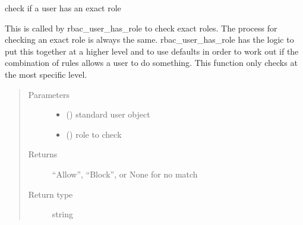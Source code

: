 \documentclass[letterpaper,10pt,english]{sphinxmanual}
\begin{document}
\begin{fulllineitems}
\label{\detokenize{rbac:rbac.core.rbac_user_has_role_exact}}
check if a user has an exact role

This is called by rbac\_user\_has\_role to check exact roles. The process
for checking an exact role is always the same. rbac\_user\_has\_role has
the logic to put this together at a higher level and to use defaults
in order to work out if the combination of rules allows a user to do
something. This function only checks at the most specific level.
\begin{quote}\begin{description}
\item[{Parameters}] \leavevmode\begin{itemize}
\item {} 
 ({\hyperref[\detokenize{accounts:accounts.models.User}]{}}) \textendash{} standard user object

\item {} 
 () \textendash{} role to check

\end{itemize}

\item[{Returns}] \leavevmode
“Allow”, “Block”, or None for no match

\item[{Return type}] \leavevmode
string

\end{description}\end{quote}

\end{fulllineitems}

\end{document}
